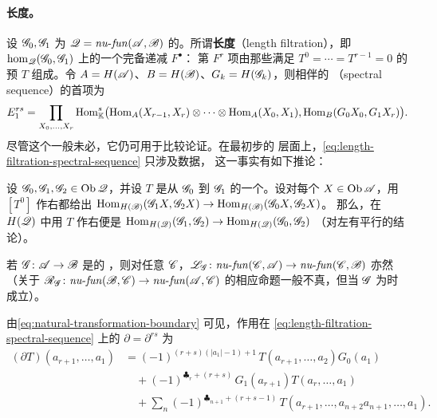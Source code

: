 \paragraph{长度\trFiltration。}\label{sub:length-filtration}
设 $\mathscr{G}_0,\mathscr{G}_1$ 为 $\mathscr{Q}=\mathit{nu}\text{-}\mathit{fun}(\mathscr{A},\mathscr{B})$
的\trObject{}。所谓\textbf{长度\trFiltration}（length filtration），即
$\hom_{\mathscr{Q}}(\mathscr{G}_0,\mathscr{G}_1)$ 上的一个完备递减\trFiltration{} $F^{\bullet}$：
第 $F^r$ 项由那些满足 $T^0=\cdots=T^{r-1}=0$ 的预\trNaturalTransformation{} $T$
组成。令 $A=H(\mathscr{A})$、$B=H(\mathscr{B})$、$G_k=H(\mathscr{G}_k)$，则相伴的
\textbf{\trSpectralSequence}（spectral sequence）的首项为
\begin{equation}\label{eq:length-filtration-spectral-sequence}
E_1^{rs}=\prod_{X_0,\ldots,X_r}\operatorname{Hom}^{s}_{\mathbb{K}}\bigl(
  \operatorname{Hom}_{A}(X_{r-1},X_r)\otimes\cdots\otimes\operatorname{Hom}_{A}(X_0,X_1),
  \operatorname{Hom}_{B}(G_0X_0,G_1X_r)\bigr).
\end{equation}
尽管这个\trSpectralSequence{}一般未必\trConvergence，它仍可用于比较论证。在最初步的
层面上，\eqref{eq:length-filtration-spectral-sequence} 只涉及\trCohomology{}数据，
这一事实有如下推论：
\begin{lemma}\label{thm:right-composition-iso}
设 $\mathscr{G}_0,\mathscr{G}_1,\mathscr{G}_2\in\operatorname{Ob}\mathscr{Q}$，并设 $T$ 是从 $\mathscr{G}_0$ 到
$\mathscr{G}_1$ 的一个\trNaturalTransformation{}。设对每个 $X\in\operatorname{Ob}\mathscr{A}$，用 $[T^0]$
作右\trComposition{}都给出\trIsomorphism{}%
$\operatorname{Hom}_{H(\mathscr{B})}(\mathscr{G}_1X,\mathscr{G}_2X)\to\operatorname{Hom}_{H(\mathscr{B})}(\mathscr{G}_0X,\mathscr{G}_2X)$。
那么，在 $H(\mathscr{Q})$ 中用 $T$ 作右\trComposition{}便是\trIsomorphism{}%
$\operatorname{Hom}_{H(\mathscr{Q})}(\mathscr{G}_1,\mathscr{G}_2)\to\operatorname{Hom}_{H(\mathscr{Q})}(\mathscr{G}_0,\mathscr{G}_2)$
（对左\trComposition{}有平行的结论）。\noqed
\end{lemma}
\begin{lemma}\label{thm:left-composition-cff}
若 $\mathscr{G}\colon\mathscr{A}\to\mathscr{B}$ 是\trCohomology\trFullyFaithful{}的\trNonunital{} \trAFunctor，则对任意
$\mathscr{C}$，$\mathscr{L}_{\mathscr{G}}\colon\mathit{nu}\text{-}\mathit{fun}(\mathscr{C},\mathscr{A})
\to\mathit{nu}\text{-}\mathit{fun}(\mathscr{C},\mathscr{B})$ 亦然（关于
$\mathscr{R}_{\mathscr{G}}\colon\mathit{nu}\text{-}\mathit{fun}(\mathscr{B},\mathscr{C})
\to\mathit{nu}\text{-}\mathit{fun}(\mathscr{A},\mathscr{C})$ 的相应命题一般不真，但当
$\mathscr{G}$ 为\trQuasiisomorphism{}时成立）。\noqed
\end{lemma}
由\eqref{eq:natural-transformation-boundary} 可见，作用在
\eqref{eq:length-filtration-spectral-sequence} 上的\trDifferential{}%
$\partial=\partial^{rs}$ 为
\begin{equation*}
\begin{split}
(\partial T)(a_{r+1},\ldots,a_1)
&=(-1)^{(r+s)(|a_1|-1)+1}\,T(a_{r+1},\ldots,a_2)G_0(a_1)\\
&\quad+(-1)^{\clubsuit_r+(r+s)}\,G_1(a_{r+1})T(a_r,\ldots,a_1)\\
&\quad+\sum_{n}(-1)^{\clubsuit_{n+1}+(r+s-1)}\,
T(a_{r+1},\ldots,a_{n+2}a_{n+1},\ldots,a_1).
\end{split}
\end{equation*}
